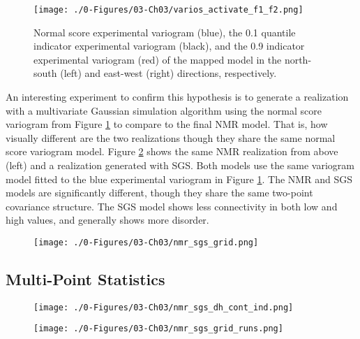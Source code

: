 \begin{figure}[htb!]
    \centering
    \texttt{[image: ./0-Figures/03-Ch03/varios\_activate\_f1\_f2.png]}
    \caption{Normal score experimental variogram (blue), the 0.1 quantile indicator experimental variogram (black), and the 0.9 indicator experimental variogram (red) of the mapped model in the north-south (left) and east-west (right) directions, respectively.}
    \label{fig:varios_activate_f1_f2}
\end{figure}

An interesting experiment to confirm this hypothesis is to generate a realization with a multivariate Gaussian simulation algorithm using the normal score variogram from Figure \ref{fig:varios_activate_f1_f2} to compare to the final \gls{NMR} model. That is, how visually different are the two realizations though they share the same normal score variogram model. Figure \ref{fig:nmr_sgs_grid} shows the same \gls{NMR} realization from above (left) and a realization generated with \gls{SGS}. Both models use the same variogram model fitted to the blue experimental variogram in Figure \ref{fig:varios_activate_f1_f2}. The \gls{NMR} and \gls{SGS} models are significantly different, though they share the same two-point covariance structure. The \gls{SGS} model shows less connectivity in both low and high values, and generally shows more disorder.

\begin{figure}[htb!]
    \centering
    \texttt{[image: ./0-Figures/03-Ch03/nmr\_sgs\_grid.png]}
    \caption{ }
    \label{fig:nmr_sgs_grid}
\end{figure}

\FloatBarrier
\subsection{Multi-Point Statistics}
\label{subsec:03multipt}

\begin{figure}[htb!]
    \centering
    \texttt{[image: ./0-Figures/03-Ch03/nmr\_sgs\_dh\_cont\_ind.png]}
    \caption{ }
    \label{fig:nmr_sgs_dh_cont_ind}
\end{figure}

\begin{figure}[htb!]
    \centering
    \texttt{[image: ./0-Figures/03-Ch03/nmr\_sgs\_grid\_runs.png]}
    \caption{ }
    \label{fig:nmr_sgs_grid_runs}
\end{figure}




